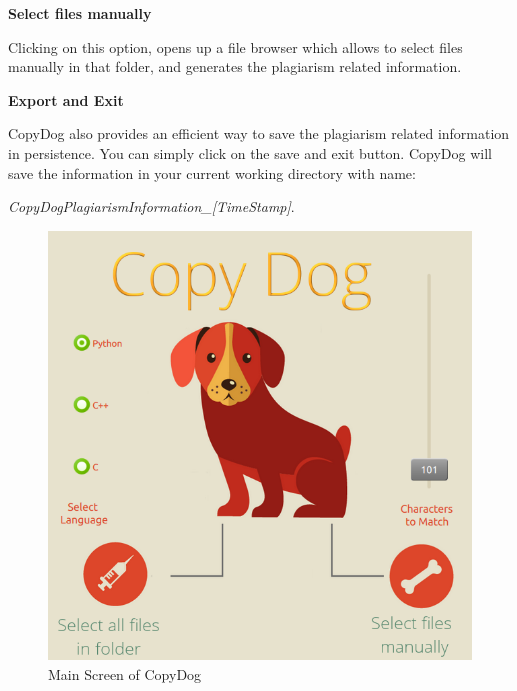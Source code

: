 \documentclass[11pt]{article}
\begin{document}
\vspace{ 3 mm} 

\noindent \textbf{Select files manually}

\vspace{ 3 mm} 

\noindent Clicking on this option, opens up a file browser which allows to select files manually in that folder, and generates the plagiarism related information.

\vspace{ 3 mm} 

\noindent \textbf{Export and Exit}

\vspace{ 3 mm} 

\noindent CopyDog also provides an efficient way to save the plagiarism related information in persistence. You can simply click on the save and exit button. CopyDog will save the information in your current working directory with name:

\emph{CopyDogPlagiarismInformation\_[TimeStamp]}. 

\begin{figure}[p]
    \centering
    \includegraphics[scale=.6]{MainScreen.png}
    \caption{Main Screen of CopyDog}
\end{figure}
\end{document}
